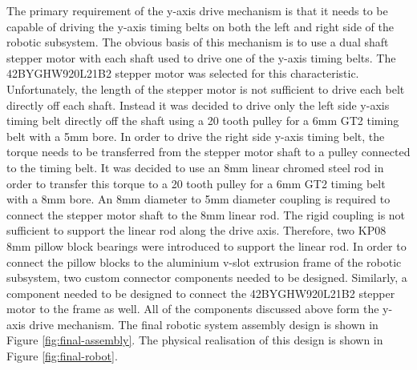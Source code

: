 
The primary requirement of the y-axis drive mechanism is that it needs to be capable of driving the y-axis timing belts on both the left and right side of the robotic subsystem. The obvious basis of this mechanism is to use a dual shaft stepper motor with each shaft used to drive one of the y-axis timing belts. The 42BYGHW920L21B2 stepper motor was selected for this characteristic. Unfortunately, the length of the stepper motor is not sufficient to drive each belt directly off each shaft. Instead it was decided to drive only the left side y-axis timing belt directly off the shaft using a 20 tooth pulley for a 6mm GT2 timing belt with a 5mm bore. In order to drive the right side y-axis timing belt, the torque needs to be transferred from the stepper motor shaft to a pulley connected to the timing belt. It was decided to use an 8mm linear chromed steel rod in order to transfer this torque to a 20 tooth pulley for a 6mm GT2 timing belt with a 8mm bore. An 8mm diameter to 5mm diameter coupling is required to connect the stepper motor shaft to the 8mm linear rod. The rigid coupling is not sufficient to support the linear rod along the drive axis. Therefore, two KP08 8mm pillow block bearings were introduced to support the linear rod. In order to connect the pillow blocks to the aluminium v-slot extrusion frame of the robotic subsystem, two custom connector components needed to be designed. Similarly, a component needed to be designed to connect the 42BYGHW920L21B2 stepper motor to the frame as well. All of the components discussed above form the y-axis drive mechanism. The final robotic system assembly design is shown in Figure \ref{fig:final-assembly}. The physical realisation of this design is shown in Figure \ref{fig:final-robot}.



